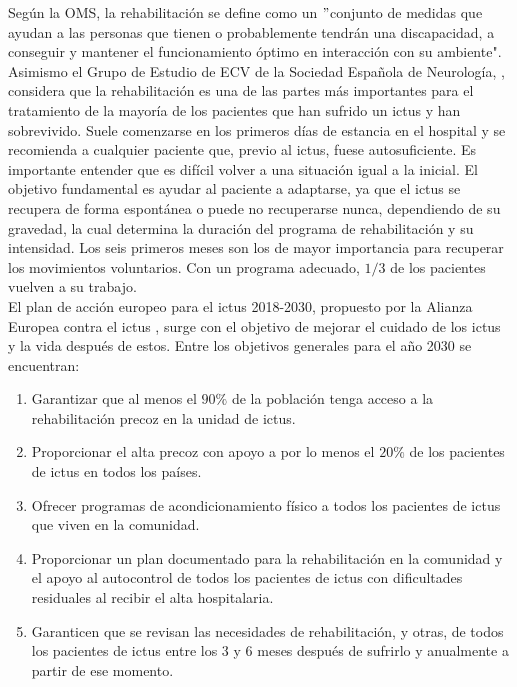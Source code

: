 \vspace{1cm}
Según la OMS, la rehabilitación se define como un $"$conjunto de medidas que ayudan a las personas que tienen o probablemente tendrán una discapacidad, a conseguir y mantener el funcionamiento óptimo en interacción con su ambiente".\\

Asimismo el Grupo de Estudio de ECV de la Sociedad Española de Neurología, \cite{perales1}, considera que la rehabilitación es una de las partes más importantes para el tratamiento de la mayoría de los pacientes que han sufrido un ictus y han sobrevivido.
Suele comenzarse en los primeros días de estancia en el hospital y se recomienda a cualquier paciente que, previo al ictus, fuese autosuficiente.
Es importante entender que es difícil volver a una situación igual a la inicial.
El objetivo fundamental es ayudar al paciente a adaptarse, ya que el ictus se recupera de forma espontánea o puede no recuperarse nunca, dependiendo de su gravedad, la cual determina la duración del programa de rehabilitación y su intensidad.
Los seis primeros meses son los de mayor importancia para recuperar los movimientos voluntarios.
Con un programa adecuado, $1/3$ de los pacientes vuelven a su trabajo.\\

El plan de acción europeo para el ictus 2018-2030, propuesto por la Alianza Europea contra el ictus \cite{perales2a}, surge con el objetivo de mejorar el cuidado de los ictus y la vida después de estos.
Entre los objetivos generales para el año 2030 se encuentran:
\begin{enumerate}
    \item Garantizar que al menos el $90\%$ de la población tenga acceso a la rehabilitación precoz en la unidad de ictus.
    \item Proporcionar el alta precoz con apoyo a por lo menos el $20\%$ de los pacientes de ictus en todos los países.
    \item Ofrecer programas de acondicionamiento físico a todos los pacientes de ictus que viven en la comunidad.
    \item Proporcionar un plan documentado para la rehabilitación en la comunidad y el apoyo al autocontrol de todos los pacientes de ictus con dificultades residuales al recibir el alta hospitalaria.
    \item Garanticen que se revisan las necesidades de rehabilitación, y otras, de todos los pacientes de ictus entre los 3 y 6 meses después de sufrirlo y anualmente a partir de ese momento.\\
\end{enumerate}\

